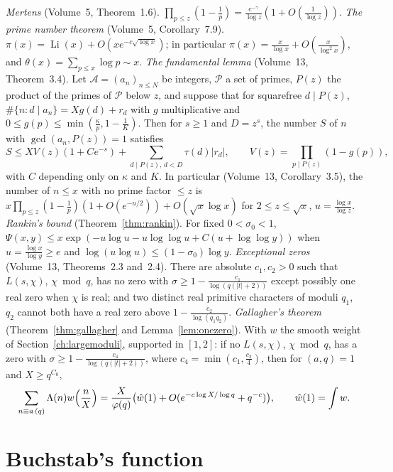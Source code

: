 \begin{reminder}
\emph{Mertens} (Volume~5, Theorem~1.6). $\prod_{p\le z}(1-\frac1p)=\frac{e^{-\gamma}}{\log z}(1+O(\frac1{\log z}))$.
\emph{The prime number theorem} (Volume~5, Corollary~7.9). $\pi(x)=\operatorname{Li}(x)+O(xe^{-c\sqrt{\log x}})$; in particular $\pi(x)=\frac x{\log x}+O(\frac x{\log^2x})$, and $\theta(x)=\sum_{p\le x}\log p\sim x$.
\emph{The fundamental lemma} (Volume~13, Theorem~3.4). Let $\mathcal A=(a_n)_{n\le N}$ be integers, $\mathcal P$ a set of primes, $P(z)$ the product of the primes of $\mathcal P$ below $z$, and suppose that for squarefree $d\mid P(z)$, $\#\{n:d\mid a_n\}=Xg(d)+r_d$ with $g$ multiplicative and $0\le g(p)\le\min(\frac\kappa p,1-\frac1K)$. Then for $s\ge1$ and $D=z^s$, the number $S$ of $n$ with $\gcd(a_n,P(z))=1$ satisfies
\[
S\le XV(z)(1+Ce^{-s})+\sum_{d\mid P(z),\,d<D}\tau(d)|r_d|,\qquad V(z)=\prod_{p\mid P(z)}(1-g(p)),
\]
with $C$ depending only on $\kappa$ and $K$. In particular (Volume~13, Corollary~3.5), the number of $n\le x$ with no prime factor $\le z$ is $x\prod_{p\le z}(1-\frac1p)(1+O(e^{-u/2}))+O(\sqrt x\log x)$ for $2\le z\le\sqrt x$, $u=\frac{\log x}{\log z}$.
\emph{Rankin's bound} (Theorem~\ref{thm:rankin}). For fixed $0<\sigma_0<1$, $\Psi(x,y)\le x\exp(-u\log u-u\log\log u+C(u+\log\log y))$ when $u=\frac{\log x}{\log y}\ge e$ and $\log(u\log u)\le(1-\sigma_0)\log y$.
\emph{Exceptional zeros} (Volume~13, Theorems~2.3 and~2.4). There are absolute $c_1,c_2>0$ such that $L(s,\chi)$, $\chi\bmod q$, has no zero with $\sigma\ge1-\frac{c_1}{\log(q(|t|+2))}$ except possibly one real zero when $\chi$ is real; and two distinct real primitive characters of moduli $q_1$, $q_2$ cannot both have a real zero above $1-\frac{c_2}{\log(q_1q_2)}$.
\emph{Gallagher's theorem} (Theorem~\ref{thm:gallagher} and Lemma~\ref{lem:onezero}). With $w$ the smooth weight of Section~\ref{ch:largemoduli}, supported in $[1,2]$: if no $L(s,\chi)$, $\chi\bmod q$, has a zero with $\sigma\ge1-\frac{c_4}{\log(q(|t|+2))}$, where $c_4=\min(c_1,\frac{c_2}4)$, then for $(a,q)=1$ and $X\ge q^{C_0}$,
\[
\sum_{n\equiv a\,(q)}\Lambda(n)w\Bigl(\frac nX\Bigr)=\frac X{\varphi(q)}\bigl(\hat w(1)+O(e^{-c\log X/\log q}+q^{-c})\bigr),\qquad\hat w(1)=\int w.
\]
\end{reminder}

\section{Buchstab's function}

